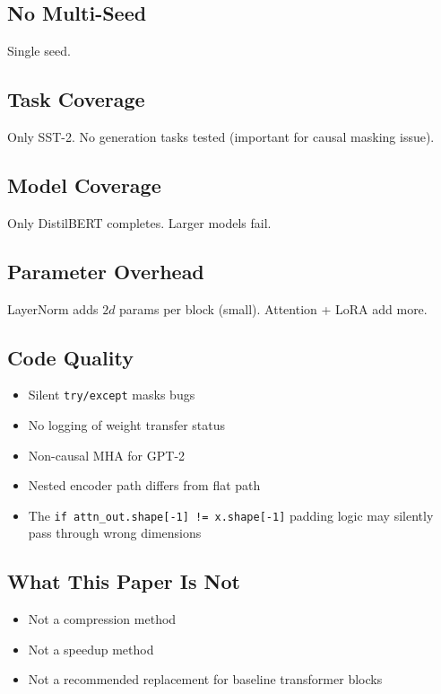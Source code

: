 \subsection{No Multi-Seed}

Single seed.

\subsection{Task Coverage}

Only SST-2. No generation tasks tested (important for causal masking issue).

\subsection{Model Coverage}

Only DistilBERT completes. Larger models fail.

\subsection{Parameter Overhead}

LayerNorm adds $2d$ params per block (small). Attention + LoRA add more.

\subsection{Code Quality}

\begin{itemize}
\item Silent \texttt{try/except} masks bugs
\item No logging of weight transfer status
\item Non-causal MHA for GPT-2
\item Nested encoder path differs from flat path
\item The \texttt{if attn\_out.shape[-1] != x.shape[-1]} padding logic may silently
  pass through wrong dimensions

\end{itemize}
\subsection{What This Paper Is Not}

\begin{itemize}
\item Not a compression method
\item Not a speedup method
\item Not a recommended replacement for baseline transformer blocks

\end{itemize}

